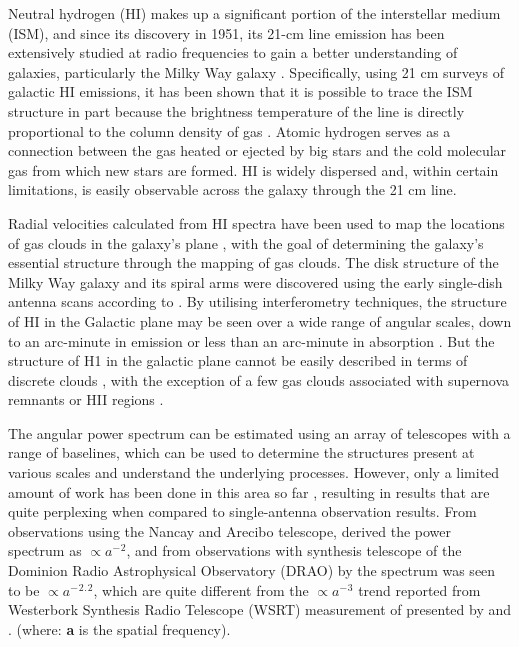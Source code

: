 {Neutral hydrogen (HI) makes up a significant portion of the interstellar medium (ISM), and since its discovery in 1951, its 21-cm line emission has been extensively studied at radio frequencies to gain a better understanding of galaxies, particularly the Milky Way galaxy \cite{storey199421}.
Specifically, using 21 cm surveys of  galactic HI emissions, it has been shown that it is possible to trace the ISM structure in part because the brightness temperature of the line is directly proportional to the column density of gas \cite{crovisier1983spatial}. 
Atomic hydrogen serves as a connection between the gas heated or ejected by big stars and the cold molecular gas from which new stars are formed. HI is widely dispersed and, within certain limitations, is easily observable across the galaxy through the 21 cm line.



Radial velocities calculated from HI spectra have been used to map the locations of gas clouds in the galaxy's plane \cite{bekhti2016hi4pi}, with the goal of determining the galaxy's essential structure through the mapping of gas clouds. The disk structure of the Milky Way galaxy and its spiral arms were discovered using the early single-dish antenna scans according to \cite{dickey2001southern,mcclure2001southern}.
By utilising interferometry techniques, the structure of HI in the Galactic plane may be seen over a wide range of angular scales, down to an arc-minute in emission or less than an arc-minute in absorption  \cite{deshpande2000power,crovisier1985observation,kalberla1985high} . But the structure of H1 in the galactic plane cannot be easily described in terms of discrete clouds \cite{deshpande2000power, clark1965interferometer, clark1962hydrogen}, with the exception of a few gas clouds associated with supernova remnants or HII regions \cite {green1993power, sturner1994association, routledge1991structure}. 


The angular power spectrum can be estimated using an array of telescopes with a range of baselines, which can be used to determine the structures present at various scales and understand the underlying processes. However, only a limited amount of work has been done in this area so far \cite{green1993power}, resulting in results that are quite perplexing when compared to single-antenna observation results. From observations using the Nancay and Arecibo telescope, \cite{dickey2001southern} derived the power spectrum as \(\propto {a^-}{^2}\), and from observations with synthesis
telescope of the Dominion Radio Astrophysical Observatory (DRAO) by \cite{green1993power} the spectrum was seen to be \(\propto {a^-}{^2}{^.}{^2}\),
which are quite different from the \(\propto {a^-}{^3}\) trend reported from Westerbork Synthesis Radio Telescope (WSRT) measurement of  presented by \cite{crovisier1983spatial} and \cite{green2006angular}. (where: \textbf{a} is the spatial frequency).


}
